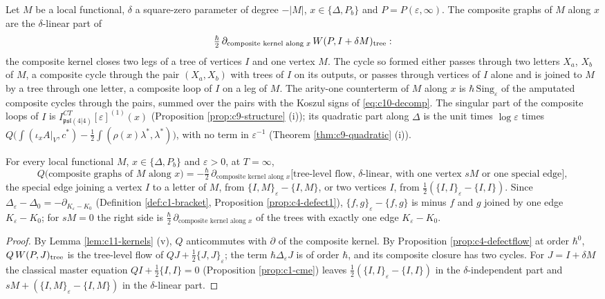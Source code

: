 \begin{definition}
\label{def:c11-graphs}
Let $M$ be a local functional, $\delta$ a square-zero parameter of degree $-|M|$, $x\in\{\Delta,P_b\}$ and $P=P(\varepsilon,\infty)$. The composite graphs of $M$ along $x$ are the $\delta$-linear part of
\[
\tfrac\hbar2\,\partial_{\text{composite kernel along }x}\,W(P,I+\delta M)_{\rm tree}:
\]
the composite kernel closes two legs of a tree of vertices $I$ and one vertex $M$. The cycle so formed either passes through two letters $X_a$, $X_b$ of $M$, a composite cycle through the pair $(X_a,X_b)$ with trees of $I$ on its outputs, or passes through vertices of $I$ alone and is joined to $M$ by a tree through one letter, a composite loop of $I$ on a leg of $M$. The arity-one counterterm of $M$ along $x$ is $\hbar\,\mathrm{Sing}_\varepsilon$ of the amputated composite cycles through the pairs, summed over the pairs with the Koszul signs of \eqref{eq:c10-decomp}. The singular part of the composite loops of $I$ is $I^{CT}_{\mathfrak{psl}(4|4)}[\varepsilon]^{(1)}(x)$ (Proposition \ref{prop:c9-structure} (i)); its quadratic part along $\Delta$ is the unit times $\log\varepsilon$ times $Q\big(\int(\iota_xA|_V,c^*)-\tfrac12\int(\rho(x)\lambda^*,\lambda^*)\big)$, with no term in $\varepsilon^{-1}$ (Theorem \ref{thm:c9-quadratic} (i)).
\end{definition}

\begin{proposition}
\label{prop:c11-master}
For every local functional $M$, $x\in\{\Delta,P_b\}$ and $\varepsilon>0$, at $T=\infty$,
\[
Q\big(\text{composite graphs of }M\text{ along }x\big)=-\tfrac\hbar2\,\partial_{\text{composite kernel along }x}\Big[\text{tree-level flow, }\delta\text{-linear, with one vertex }sM\text{ or one special edge}\Big],
\]
the special edge joining a vertex $I$ to a letter of $M$, from $\{I,M\}_\varepsilon-\{I,M\}$, or two vertices $I$, from $\tfrac12(\{I,I\}_\varepsilon-\{I,I\})$. Since $\Delta_\varepsilon-\Delta_0=-\partial_{K_\varepsilon-K_0}$ (Definition \ref{def:c1-bracket}, Proposition \ref{prop:c4-defect1}), $\{f,g\}_\varepsilon-\{f,g\}$ is minus $f$ and $g$ joined by one edge $K_\varepsilon-K_0$; for $sM=0$ the right side is $\tfrac\hbar2\,\partial_{\text{composite kernel along }x}$ of the trees with exactly one edge $K_\varepsilon-K_0$.
\end{proposition}

\begin{proof}
By Lemma \ref{lem:c11-kernels} (v), $Q$ anticommutes with $\partial$ of the composite kernel. By Proposition \ref{prop:c4-defectflow} at order $\hbar^0$, $Q\,W(P,J)_{\rm tree}$ is the tree-level flow of $QJ+\tfrac12\{J,J\}_\varepsilon$; the term $\hbar\Delta_\varepsilon J$ is of order $\hbar$, and its composite closure has two cycles. For $J=I+\delta M$ the classical master equation $QI+\tfrac12\{I,I\}=0$ (Proposition \ref{prop:c1-cme}) leaves $\tfrac12(\{I,I\}_\varepsilon-\{I,I\})$ in the $\delta$-independent part and $sM+(\{I,M\}_\varepsilon-\{I,M\})$ in the $\delta$-linear part.
\end{proof}


